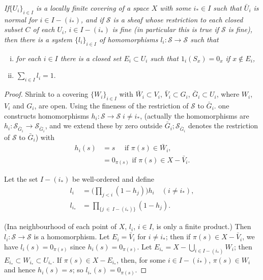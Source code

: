 \medskip
{}
\textit{If\pageoriginale $\{U_i\}_{i \in I}$ is a locally finite
  covering of a space $X$ 
  with some $i_* \in I$ such that $\bar{U}_i$ is normal for $i \in I
- (i_*)$, and if $\mathscr{S}$ is a sheaf whose restriction to each
closed subset $C$ of each $U_i$, $i \in I - (i_*)$ is fine (in
particular this is true if $\mathscr{S}$ is fine), then there is a
system $\{l_i\}_{i \in I}$ of homomorphisms $l_i : \mathscr{S}
\rightarrow \mathscr{S}$ such that}  
\begin{enumerate}[(i)]
\item \textit{for each $i \in I$ there is a closed set $E_i \subset
  U_i$ such that $1_i(S_x) = 0_x$ if $x \notin E_i$,}  

\item $\sum\limits_{i \in I} l_i = 1$.
\end{enumerate}

\begin{proof}%
Shrink to a covering $\{W_i\}_{i \in I}$ with $\bar{W}_i \subset V_i$,
$\bar{V}_i \subset G_i$, $\bar{G}_i \subset U_i$, where $W_i$, $V_i$ and
$G_i$, are open. Using the fineness of the restriction of
$\mathscr{S}$ to $\bar{G}_i$. one constructs homomorphisms $h_i :
\mathscr{S} \rightarrow \mathscr{S} \; i \neq i_*$, (actually the
homomorphisms are $h_i : \mathscr{S}_{\bar{G}_i} \rightarrow
\mathscr{S}_{\bar{G}_i}$, and we extend these by zero outside
$\bar{G}_i; \mathscr{S}_{\bar{G}_i}$ denotes the restriction of
$\mathscr{S}$ to $\bar{G}_i$) with  
\begin{align*}
h_i (s) & = s \quad \text{ if } \pi(s) \in \bar{W}_i,\\
& = 0_{\pi(s)} \text{ if } \pi(s) \in X - \bar{V}_i.
\end{align*}

Let the set $I - (i_*)$ be well-ordered and define
\begin{align*}
l_i & = \Big( \prod_{j < i} (1-h_j)\Big) h_i \quad (i \neq i_*),\\ 
l_{i_*} & = \prod_{\{ j ~ \in ~ I - (i_*) \}} (1-h_j).
\end{align*} 

(In\pageoriginale a neighbourhood of each point of $X$, $l_i$, $i \in
I$, is only a finite product.) Then $l_i : \mathscr{S} \rightarrow
\mathscr{S}$ is a 
homomorphism. Let $E_i = \bar{V}_i$ for $i \neq i_*$; then if $\pi(s)
\in X - \bar{V}_i$, we have $l_i(s) = 0_{\pi(s)}$ since $h_i(s) =
0_{\pi(s)}$. Let $E_{i_*} = X- \bigcup\limits_{i \in I - (i_*)} W_i$;
then $E_{i_*} \subset W_{i_*} \subset U_{i_*}$. If $\pi(s) \in X -
E_{i_*}$, then, for some $i \in I - (i_*)$, $\pi(s) \in W_i$ and hence
$h_i(s) = s$; so $l_{i_*}(s) = 0_{\pi(s)}$. 
\end{proof}

